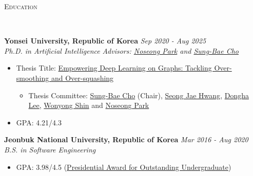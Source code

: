 \documentclass[10pt]{article}
\newenvironment{changemargin}[2]{
  \begin{list}{}{
    \setlength{\topsep}{0pt}
    \setlength{\leftmargin}{#1}
    \setlength{\rightmargin}{#2}
    \setlength{\listparindent}{\parindent}
    \setlength{\itemindent}{\parindent}
    \setlength{\parsep}{\parskip}
  }
  \item[]}{\end{list}
}
\newcommand{\lineover}{
	\begin{changemargin}{-0.05in}{-0.05in}
		\vspace*{-8pt}
		\hrulefill \\
		\vspace*{-2pt}
	\end{changemargin}
}
\newcommand{\header}[1]{
	\begin{changemargin}{-0.5in}{-0.5in}
		\scshape{#1}\\
  	\lineover
	\end{changemargin}
}
\newenvironment{body} {
	\vspace*{-16pt}
	\begin{changemargin}{-0.25in}{-0.5in}
  }
	{\end{changemargin}
}
\begin{document}
\header{Education}

\begin{body}
	\vspace{14pt}
	\textbf{Yonsei University, Republic of Korea} \hfill \emph{Sep 2020 -  Aug 2025} \\
	\emph{Ph.D. in Artificial Intelligence} \hfill \emph{Advisors: \href{https://scholar.google.com/citations?user=VSuM3gYAAAAJ&hl=en}{Noseong Park} and \href{https://scholar.google.com/citations?user=px5LGgMAAAAJ&hl=en}{Sung-Bae Cho}}\\
    \begin{itemize}
        \item Thesis Title: {\href{https://www.jeongwhanchoi.com/assets/thesis.pdf}{Empowering Deep Learning on Graphs: Tackling Over-smoothing and Over-squashing}}
        \begin{itemize}
            \item Thesis Committee: \href{https://scholar.google.com/citations?user=px5LGgMAAAAJ&hl=en}{Sung-Bae Cho} (Chair), \href{https://scholar.google.com/citations?user=d4WCQbUAAAAJ&hl=en}{Seong Jae Hwang}, \href{https://scholar.google.com/citations?user=driVwKwAAAAJ&hl=en}{Dongha Lee}, \href{https://scholar.google.com/citations?user=PwOjMLEAAAAJ&hl=en}{Wonyong Shin} and \href{https://scholar.google.com/citations?user=VSuM3gYAAAAJ&hl=en}{Noseong Park}
        \end{itemize}
        \item GPA: 4.21/4.3
    \end{itemize}
\end{body}

\begin{body}
	\vspace{14pt}
	\textbf{Jeonbuk National University, Republic of Korea} \hfill \emph{Mar 2016 -  Aug 2020} \\
	\emph{B.S. in Software Engineering}\\
	\begin{itemize} \itemsep -0pt  %
    \item GPA: 3.98/4.5 (\href{https://www.jeongwhanchoi.com/assets/award/JBNU_outstanding_undergraduate.pdf}{Presidential Award for Outstanding Undergraduate})
	\end{itemize}
\end{body}

\medskip
\end{document}
